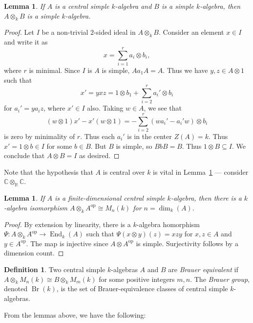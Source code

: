 \documentclass[12pt]{article}
\theoremstyle{plain}
\newtheorem{lemma}[theorem]{Lemma}
\theoremstyle{definition}
\newtheorem{definition}[theorem]{Definition}
\theoremstyle{remark}
\numberwithin{equation}{section}
\begin{document}
\begin{lemma} \label{lem:csa_simple_simple}
If $A$ is a central simple $k$-algebra and
$B$ is a simple $k$-algebra, then $A \otimes_k B$ is a simple
$k$-algebra.
\end{lemma}

\begin{proof}
Let $I$ be a non-trivial $2$-sided ideal in $A \otimes_k B$.
Consider an element $x \in I$ and write it as
\[
x = \sum_{i=1}^r a_i \otimes b_i,
\]
where $r$ is minimal.
Since $I$ is $A$ is simple, $Aa_1A=A$.  Thus we have $y,z \in A \otimes 1$
such that
\[
x'=yxz = 1 \otimes b_1 + \sum_{i=2}^r a_i' \otimes b_i
\]
for $a_i'=ya_iz$, where $x' \in I$ also.
Taking $w \in A$, we see that
\[
(w \otimes 1)x' - x'(w \otimes 1) = -\sum_{i=2}^r (wa_i'-a_i'w) \otimes
b_i
\]
is zero by minimality of $r$.  Thus each $a_i'$ is in the center
$Z(A)=k$.  Thus $x'=1 \otimes b \in I$ for some $b \in B$.
But $B$ is simple, so $BbB=B$.  Thus $1 \otimes B \subseteq I$.
We conclude that $A \otimes B = I$ as desired.
\end{proof}

Note that the hypothesis that $A$ is central over $k$ is vital
in Lemma~\ref{lem:csa_simple_simple} --- consider $\mathbb{C}
\otimes_{\mathbb{R}} \mathbb{C}$.

\begin{lemma}
If $A$ is a finite-dimensional central simple $k$-algebra,
then there is a $k$-algebra isomorphism
$A \otimes_k A^{\mathrm{op}} \cong M_n(k)$
for $n = \dim_k(A)$.
\end{lemma}

\begin{proof}
By extension by linearity, there is a $k$-algebra homorphism
$\Psi : A \otimes_k A^{\mathrm{op}} \to \operatorname{End}_k(A)$
such that $\Psi(x \otimes y)(z)=xzy$ for $x,z \in A$ and
$y \in A^{\mathrm{op}}$.  The map is injective since
$A \otimes A^{\mathrm{op}}$ is simple.
Surjectivity follows by a dimension count.
\end{proof}

\begin{definition}
Two central simple $k$-algebras $A$ and $B$ are
\emph{Brauer equivalent} if $A \otimes_k M_n(k) \cong B \otimes_k
M_m(k)$ for some positive integers $m,n$.
The \emph{Brauer group}, denoted $\operatorname{Br}(k)$,
is the set of Brauer-equivalence classes
of central simple $k$-algebras.
\end{definition}

From the lemmas above, we have the following:
\end{document}
